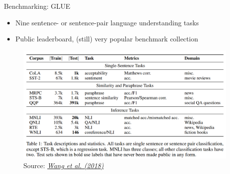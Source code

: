 
\begin{vbframe}{Benchmarking: GLUE}

\vfill

\begin{itemize}
	\item Nine sentence- or sentence-pair language understanding tasks
	\item Public leaderboard, (still) very popular benchmark collection
\end{itemize}

	\begin{figure}
		\centering
		\includegraphics[width = 11cm]{figure/glue.png}\\ 
		\footnotesize{Source:} \href{https://openreview.net/pdf?id=rJ4km2R5t7}{\footnotesize \it Wang et al. (2018)}
	\end{figure}

\vfill

\end{vbframe}


